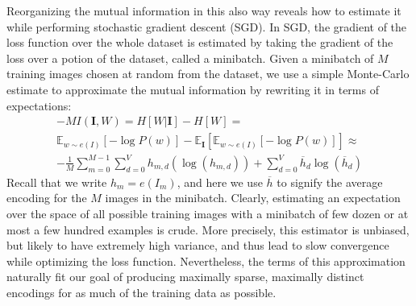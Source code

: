 Reorganizing the mutual information in this also way reveals how to estimate it while performing stochastic gradient descent (SGD). In SGD, the gradient of the loss function over the whole dataset is estimated by taking the gradient of the loss over a potion of the dataset, called a minibatch. Given a minibatch of $M$ training images chosen at random from the dataset, we use a simple Monte-Carlo estimate to approximate the mutual information by rewriting it in terms of expectations:
\begin{equation}
\begin{split}
    -MI\left(\mathbf{I}, W\right) = H[W | \mathbf{I}] - H[W] = \\
    \mathbb{E}_{w \sim e(I)}\left[ -\log P(w) \right] - \mathbb{E}_\mathbf{I}\left[ \mathbb{E}_{w \sim e(I)}\left[ -\log P(w) \right] \right] \approx \\
    -\frac{1}{M} \sum_{m=0}^{M-1} \sum_{d=0}^V h_{m,d} (\log(h_{m,d})) +
            \sum_{d=0}^V \overline{h}_d \log(\overline{h}_d)
    \end{split}
\end{equation}
Recall that we write $h_m = e(I_m)$, and here we use $\overline{h}$ to signify the average encoding for the $M$ images in the minibatch.
Clearly, estimating an expectation over the space of all possible training images with a minibatch of few dozen or at most a few hundred examples is crude. More precisely, this estimator is unbiased, but likely to have extremely high variance, and thus lead to slow convergence while optimizing the loss function. Nevertheless, the terms of this approximation naturally fit our goal of producing maximally sparse, maximally distinct encodings for as much of the training data as possible.

